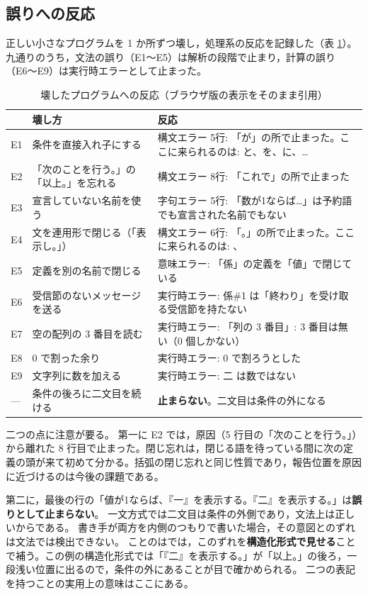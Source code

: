 \documentclass[a4paper,10pt]{ltjsarticle}
\begin{document}
\subsection{誤りへの反応}\label{sec:err}

正しい小さなプログラムを 1 か所ずつ壊し，処理系の反応を記録した（表 \ref{tab:err}）。
九通りのうち，文法の誤り（E1〜E5）は解析の段階で止まり，計算の誤り（E6〜E9）は実行時エラーとして止まった。

\begin{table}[t]
\centering\small
\caption{壊したプログラムへの反応（ブラウザ版の表示をそのまま引用）}\label{tab:err}
\begin{tabular}{@{}lp{40mm}p{88mm}@{}}
\toprule
 & 壊し方 & 反応 \\
\midrule
E1 & 条件を直接入れ子にする & 構文エラー 5行: 「が」の所で止まった。ここに来られるのは: と、を、に、… \\
E2 & 「次のことを行う。」の「以上。」を忘れる & 構文エラー 8行: 「これで」の所で止まった \\
E3 & 宣言していない名前を使う & 字句エラー 5行: 「数が1ならば…」は予約語でも宣言された名前でもない \\
E4 & 文を連用形で閉じる（「表示し。」） & 構文エラー 6行: 「。」の所で止まった。ここに来られるのは: 、 \\
E5 & 定義を別の名前で閉じる & 意味エラー: 「係」の定義を「値」で閉じている \\
E6 & 受信節のないメッセージを送る & 実行時エラー: 係\#1 は「終わり」を受け取る受信節を持たない \\
E7 & 空の配列の 3 番目を読む & 実行時エラー: 「列の 3 番目」: 3 番目は無い（0 個しかない） \\
E8 & 0 で割った余り & 実行時エラー: 0 で割ろうとした \\
E9 & 文字列に数を加える & 実行時エラー: 二 は数ではない \\
\midrule
--- & 条件の後ろに二文目を続ける & \textbf{止まらない}。二文目は条件の外になる \\
\bottomrule
\end{tabular}
\end{table}

二つの点に注意が要る。
第一に E2 では，原因（5 行目の「次のことを行う。」）から離れた 8 行目で止まった。閉じ忘れは，閉じる語を待っている間に次の定義の頭が来て初めて分かる。括弧の閉じ忘れと同じ性質であり，報告位置を原因に近づけるのは今後の課題である。

第二に，最後の行の「値が1ならば、『一』を表示する。『二』を表示する。」は\textbf{誤りとして止まらない}。
一文方式では二文目は条件の外側であり，文法上は正しいからである。
書き手が両方を内側のつもりで書いた場合，その意図とのずれは文法では検出できない。
ことのはでは，このずれを\textbf{構造化形式で見せる}ことで補う。この例の構造化形式では「『二』を表示する。」が「以上。」の後ろ，一段浅い位置に出るので，条件の外にあることが目で確かめられる。
二つの表記を持つことの実用上の意味はここにある。
\end{document}
